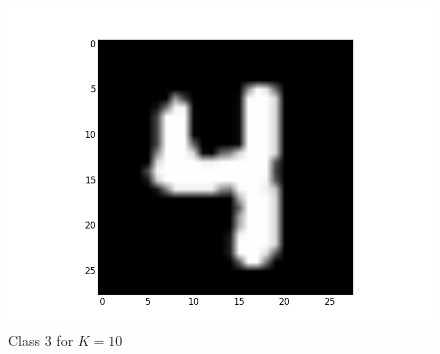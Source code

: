 \documentclass[submit]{harvardml}
\begin{document}
\begin{figure}[ht]
    \includegraphics[scale=0.20]{representative-2-2}
    \caption{Class 3 for $K=10$}
\end{figure}
\end{document}
